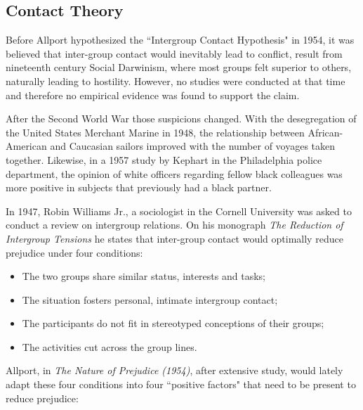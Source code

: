 \documentclass[runningheads]{llncs}
\begin{document}
\subsection{Contact Theory}
\par Before Allport hypothesized the ``Intergroup Contact Hypothesis" in 1954, it was believed that inter-group contact would inevitably lead to conflict, result from nineteenth century Social Darwinism, where most groups felt superior to others, naturally leading to hostility. However, no studies were conducted at that time and therefore no empirical evidence was found to support the claim. 
\par After the Second World War those suspicions changed. With the desegregation of the United States Merchant Marine in 1948, the relationship between African-American and Caucasian sailors improved with the number of voyages taken together. Likewise, in a 1957 study by Kephart in the Philadelphia police department, the opinion of white officers regarding fellow black colleagues was more positive in subjects that previously had a black partner.
\par In 1947, Robin Williams Jr., a sociologist in the Cornell University was asked to conduct a review on intergroup relations. On his monograph \textit{The Reduction of Intergroup Tensions} he states that inter-group contact would optimally reduce prejudice under four conditions:
\begin{itemize}
    \item The two groups share similar status, interests and tasks;
    \item The situation fosters personal, intimate intergroup contact;
    \item The participants do not fit in stereotyped conceptions of their groups;
    \item The activities cut across the group lines.
\end{itemize}
\par Allport, in \textit{The Nature of Prejudice (1954)}, after extensive study, would lately adapt these four conditions into four ``positive factors" that need to be present to reduce prejudice:
\end{document}
